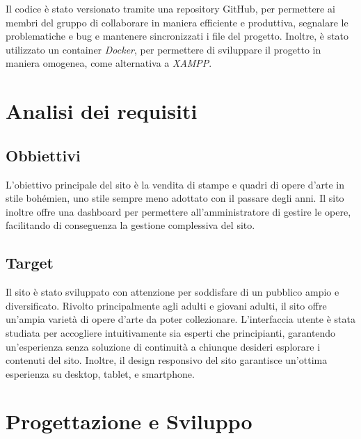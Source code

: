 \documentclass[11pt]{article}
\begin{document}
Il codice è stato versionato tramite una repository GitHub, per permettere ai membri del gruppo di collaborare in maniera efficiente e produttiva, segnalare le problematiche e bug e mantenere sincronizzati i file del progetto. Inoltre, è stato utilizzato un container \emph{Docker}, per permettere di sviluppare il progetto in maniera omogenea, come alternativa a \emph{XAMPP}.
\section{Analisi dei requisiti}
\label{sec:org8e764c1}
\subsection{Obbiettivi}
\label{sec:org96d199b}
L'obiettivo principale del sito è la vendita di stampe e quadri di opere d'arte in stile bohémien, uno stile sempre meno adottato con il passare degli anni. Il sito inoltre offre una dashboard per permettere all'amministratore di gestire le opere, facilitando di conseguenza la gestione complessiva del sito.
\subsection{Target}
\label{sec:org613b6cd}
Il sito è stato sviluppato con attenzione per soddisfare di un pubblico ampio e diversificato. Rivolto principalmente agli adulti e giovani adulti, il sito offre un'ampia varietà di opere d'arte da poter collezionare. L'interfaccia utente è stata studiata per accogliere intuitivamente sia esperti che principianti, garantendo un'esperienza senza soluzione di continuità a chiunque desideri esplorare i contenuti del sito. Inoltre, il design responsivo del sito garantisce un'ottima esperienza su desktop, tablet, e smartphone.
\section{Progettazione e Sviluppo}
\label{sec:orge8f922c}
\end{document}
